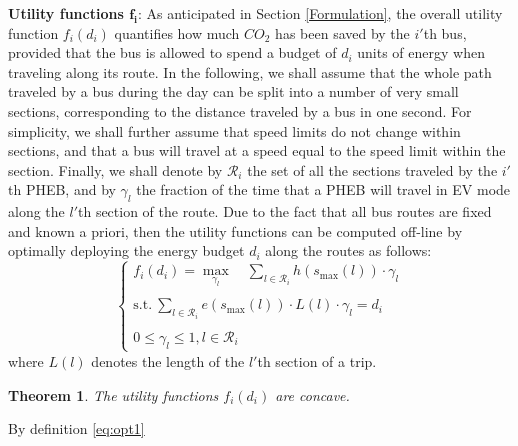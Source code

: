 \documentclass[journal]{IEEEtran}
\newtheorem{theorem}{Theorem}
{ \theorembodyfont{\normalfont} \newtheorem{example}[theorem]{Example}
	\newtheorem{remark}[theorem]{Remark}
}
\begin{document}
\textbf{Utility functions $\pmb{f_i}$}: As anticipated in Section \ref{Formulation}, the overall utility function $f_i(d_i)$ quantifies how much $CO_2$ has been saved by the $i'$th bus, provided that the bus is allowed to spend a budget of $d_i$ units of energy when traveling along its route. In the following, we shall assume that the whole path traveled by a bus during the day can be split into a number of very small sections, corresponding to the distance traveled by a bus in one second. For simplicity, we shall further assume that speed limits do not change within sections, and that a bus will travel at a speed equal to the speed limit within the section. Finally, we shall denote by $\mathcal{R}_i$ the set of all the sections traveled by the $i'$th PHEB, and by $\gamma_l$ the fraction of the time that a PHEB will travel in EV mode along the $l'$th section of the route. Due to the fact that all bus routes are fixed and known a priori, then the utility functions can be computed off-line by optimally deploying the energy budget $d_i$ along the routes as follows:
\begin{equation} \label{eq:opt1}
\left\{\begin{array}{l}
f_i(d_i) = \underset{\gamma_l}{\max} \quad \sum\limits_{l \in \mathcal{R}_i} h\left(s_{\textrm{max}}(l)\right) \cdot \gamma_l\\
\\
{\text{s.t.}} ~
\sum\limits_{l \in \mathcal{R}_i} e(s_{\textrm{max}}(l)) \cdot L(l) \cdot \gamma_l = d_i\\
\\
0 \leq \gamma_l \leq 1, l \in \mathcal{R}_i\end{array}\right.
\end{equation} 
where $L(l)$ denotes the length of the $l'$th section of a trip.
\begin{theorem}
	\label{Lemma1}
	The utility functions $f_i(d_i)$ are concave.
\end{theorem}

 By definition \eqref{eq:opt1}
\end{document}
